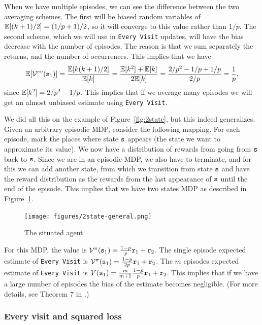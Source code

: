 \begin{advanced}
When we have multiple episodes, we can see the difference between
the two averaging schemes. The first will be biased random variables
of $\mathbb{E}[(k+1)/2]=(1/p+1)/2$, so it will converge to this value rather
than $1/p$. The second scheme, which we will use in {\tt Every
Visit} updates, will have the bias decrease with the number of
episodes. The reason is that we sum separately the returns, and the
number of occurrences. This implies that we have
\[
\mathbb{E}[\mathcal{V}^{ev}({\tt s}_1)]=\frac{\mathbb{E}[k(k+1)/2]}{\mathbb{E}[k]}=\frac{\mathbb{E}[k^2]+\mathbb{E}[k]}{2\mathbb{E}[k]}=
\frac{2/p^2-1/p+1/p}{2/p}=\frac{1}{p},
\]
since $\mathbb{E}[k^2]=2/p^2-1/p$. This implies that if we average many
episodes we will get an almost unbiased estimate using {\tt Every
Visit}.

We did all this on the example of Figure~\ref{fig:2state}, but this
indeed generalizes. Given an arbitrary episodic MDP, consider the
following mapping. For each episode, mark the places where state
${\tt s}$ appears (the state we want to approximate its value). We
now have a distribution of rewards from going from ${\tt s}$ back to
${\tt s}$. Since we are in an episodic MDP, we also have to
terminate, and for this we can add another state, from which we
transition from state ${\tt s}$ and have the reward distribution as
the rewards from the last appearance of ${\tt s}$ until the end of
the episode.
This implies that we have two states MDP as described in
Figure~\ref{fig:2state-general}.


\begin{figure}
  \begin{centering}
\texttt{[image: figures/2state-general.png]}\\
  \caption{The situated agent}\label{fig:2state-general}
  \end{centering}
\end{figure}


For this MDP, the value is
$\mathcal{V}^\pi({\tt s}_1)=\frac{1-p}{p}{\tt r}_1+{\tt r}_2$. The single
episode expected estimate of {\tt Every Visit} is
$\mathcal{V}^\pi({\tt s}_1)=\frac{1-p}{2p}{\tt r}_1+{\tt r}_2$. The $m$
episodes expected estimate of {\tt Every Visit} is
$V({\tt s}_1)=\frac{m}{m+1}\frac{1-p}{p}{\tt r}_1+{\tt r}_2$. This
implies that if we have a large number of episodes the bias of the
estimate becomes negligible. (For more details, see Theorem 7 in
\cite{SinghS96}.)


\subsubsection*{Every visit and squared loss}


\end{advanced}
